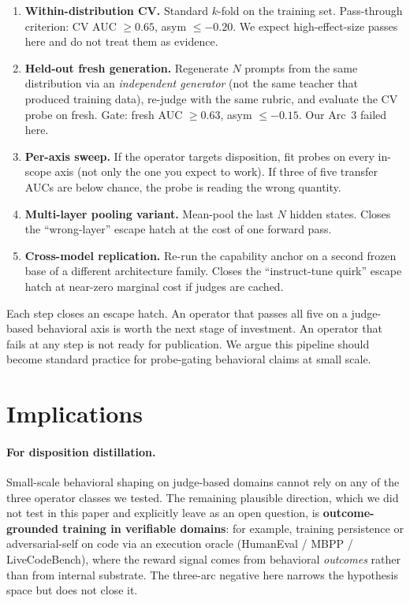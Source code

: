 \documentclass[11pt,a4paper]{article}
\begin{document}
\begin{enumerate}[leftmargin=*]
\item \textbf{Within-distribution CV.} Standard $k$-fold on the training set. Pass-through criterion: CV AUC $\geq 0.65$, asym $\leq -0.20$. We expect high-effect-size passes here and do not treat them as evidence.
\item \textbf{Held-out fresh generation.} Regenerate $N$ prompts from the same distribution via an \emph{independent generator} (not the same teacher that produced training data), re-judge with the same rubric, and evaluate the CV probe on fresh. Gate: fresh AUC $\geq 0.63$, asym $\leq -0.15$. Our Arc~3 failed here.
\item \textbf{Per-axis sweep.} If the operator targets disposition, fit probes on every in-scope axis (not only the one you expect to work). If three of five transfer AUCs are below chance, the probe is reading the wrong quantity.
\item \textbf{Multi-layer pooling variant.} Mean-pool the last $N$ hidden states. Closes the ``wrong-layer'' escape hatch at the cost of one forward pass.
\item \textbf{Cross-model replication.} Re-run the capability anchor on a second frozen base of a different architecture family. Closes the ``instruct-tune quirk'' escape hatch at near-zero marginal cost if judges are cached.
\end{enumerate}

Each step closes an escape hatch. An operator that passes all five on a judge-based behavioral axis is worth the next stage of investment. An operator that fails at any step is not ready for publication. We argue this pipeline should become standard practice for probe-gating behavioral claims at small scale.

\section{Implications}

\paragraph{For disposition distillation.} Small-scale behavioral shaping on judge-based domains cannot rely on any of the three operator classes we tested. The remaining plausible direction, which we did not test in this paper and explicitly leave as an open question, is \textbf{outcome-grounded training in verifiable domains}: for example, training persistence or adversarial-self on code via an execution oracle (HumanEval / MBPP / LiveCodeBench), where the reward signal comes from behavioral \emph{outcomes} rather than from internal substrate. The three-arc negative here narrows the hypothesis space but does not close it.
\end{document}
